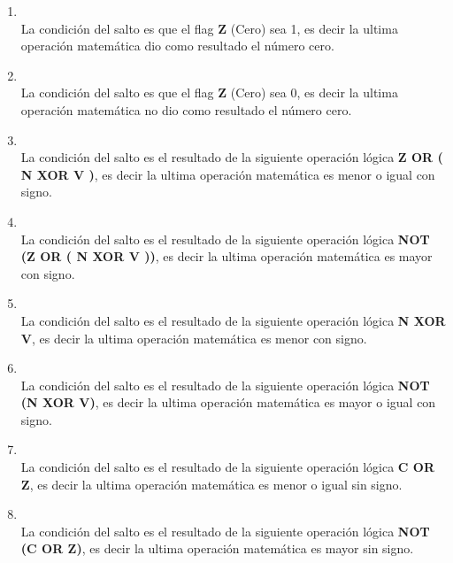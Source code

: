 \begin{enumerate}
\item  {}\\
La condición del salto es que el flag \textbf{Z} (Cero) sea 1, es decir la ultima operación matemática dio como resultado el número cero.

\item  {}\\
La condición del salto es que el flag \textbf{Z} (Cero) sea 0, es decir la ultima operación matemática no dio como resultado el número cero.

\item  {}\\
La condición del salto es el resultado de la siguiente operación lógica \textbf{Z OR ( N XOR V )}, es decir la ultima operación matemática es menor o igual con signo.

\item  {}\\
La condición del salto es el resultado de la siguiente operación lógica \textbf{NOT (Z OR ( N XOR V ))}, es decir la ultima operación matemática es mayor con signo.

\item  {}\\
La condición del salto es el resultado de la siguiente operación lógica \textbf{N XOR V}, es decir la ultima operación matemática es menor con signo.

\item  {}\\
La condición del salto es el resultado de la siguiente operación lógica \textbf{NOT (N XOR V)}, es decir la ultima operación matemática es mayor o igual con signo.

\item  {}\\
La condición del salto es el resultado de la siguiente operación lógica \textbf{C OR Z}, es decir la ultima operación matemática es menor o igual sin signo.

\item  {}\\
La condición del salto es el resultado de la siguiente operación lógica \textbf{NOT (C OR Z)}, es decir la ultima operación matemática es mayor sin signo.


\end{enumerate}
